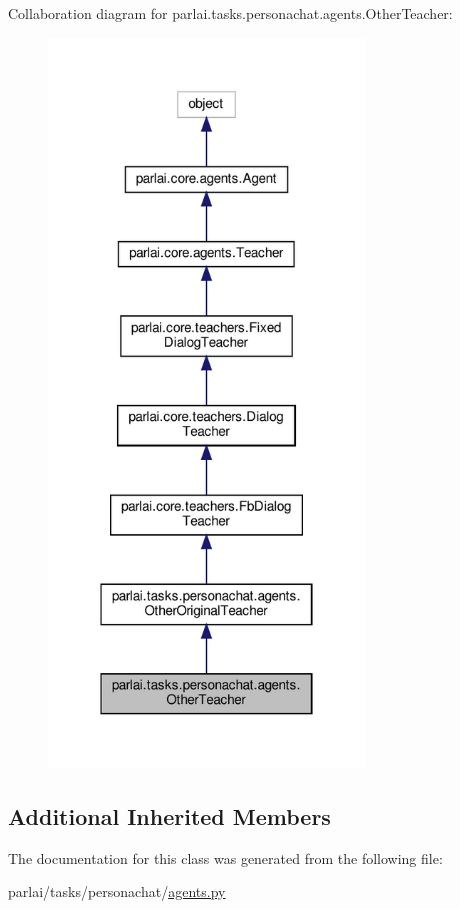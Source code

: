 Collaboration diagram for parlai.\+tasks.\+personachat.\+agents.\+Other\+Teacher\+:
\nopagebreak
\begin{figure}[H]
\begin{center}
\leavevmode
\includegraphics[width=238pt]{classparlai_1_1tasks_1_1personachat_1_1agents_1_1OtherTeacher__coll__graph}
\end{center}
\end{figure}
\subsection*{Additional Inherited Members}


The documentation for this class was generated from the following file\+:\begin{DoxyCompactItemize}
\item 
parlai/tasks/personachat/\hyperlink{parlai_2tasks_2personachat_2agents_8py}{agents.\+py}\end{DoxyCompactItemize}
